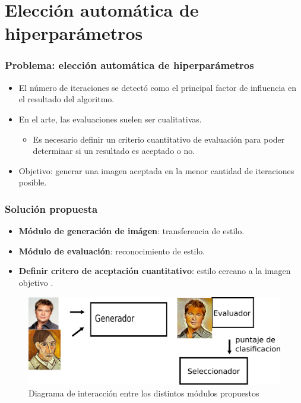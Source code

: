 \documentclass[10pt,center]{beamer}
\begin{document}
\section{Elección automática de hiperparámetros}
\begin{frame}
  \frametitle{Problema: elección automática de hiperparámetros}
  \begin{itemize}
   \item El número de iteraciones se detectó como el principal factor de influencia en el resultado del algoritmo. \vspace{0.5cm}
   \item En el arte, las evaluaciones suelen ser cualitativas.
   \begin{itemize}
    \item Es necesario definir un criterio cuantitativo de evaluación para poder determinar si un resultado es aceptado o no. \vspace{0.5cm}
   \end{itemize}
  \item Objetivo: generar una imagen aceptada en la menor cantidad de iteraciones posible.
  \end{itemize}

\end{frame}

\begin{frame}
 \frametitle{Solución propuesta}
  \begin{itemize}
   \item \textbf{Módulo de generación de imágen}: transferencia de estilo.
   \item \textbf{Módulo de evaluación}: reconocimiento de estilo.
   \item \textbf{Definir critero de aceptación cuantitativo}: estilo cercano a la imagen objetivo .
  \end{itemize}
  \begin{figure}[h]
  \captionsetup[subfigure]{labelformat=empty}
    \begin{center}
      \includegraphics[width=\linewidth]{./img/diagrama.png}
    \end{center}
    \caption{Diagrama de interacción entre los distintos módulos propuestos}
  \end{figure}
\end{frame}
\end{document}
